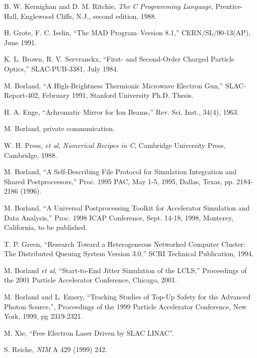 \documentclass[11pt]{article}
\begin{document}
\begin{thebibliography}{99}

    B. W. Kernighan and D. M. Ritchie, {\em The C Programming Language},
    Prentice-Hall, Englewood Cliffs, N.J., second edition, 1988.

    H. Grote, F. C. Iselin, ``The MAD Program--Version 8.1,'' CERN/SL/90-13(AP), June 1991.

    K. L. Brown, R. V. Servranckx, ``First- and Second-Order Charged Particle Optics,'' 
    SLAC-PUB-3381, July 1984.

    M. Borland, ``A High-Brightness Thermionic Microwave Electron Gun,'' SLAC-Report-402,
    February 1991, Stanford University Ph.D. Thesis.

    H. A. Enge, ``Achromatic Mirror for Ion Beams,'' Rev. Sci. Inst., 34(4), 1963.

    M. Borland, private communication.

    W. H. Press, {\em et al}, {\em Numerical Recipes in C}, Cambridge University
    Press, Cambridge, 1988.

M. Borland, ``A Self-Describing File Protocol for Simulation
Integration and Shared Postprocessors,'' Proc. 1995 PAC, May 1-5,
1995, Dallas, Texas, pp. 2184-2186 (1996).

M. Borland, ``A Universal Postprocessing Toolkit for Accelerator 
Simulation and Data Analysis,'' Proc. 1998 ICAP Conference, 
Sept. 14-18, 1998, Monterey, California, to be published.

 T. P. Green, ``Research Toward a Heterogeneous Networked
Computer Cluster: The Distributed Queuing System Version 3.0,'' SCRI
Technical Publication, 1994.

 M. Borland {\em et al}, ``Start-to-End Jitter Simulation
of the LCLS,'' Proceedings of the 2001 Particle Accelerator Conference,
Chicago, 2001.

 M. Borland and L. Emery, ``Tracking Studies of
Top-Up Safety for the Advanced Photon Source,'', Proceedings of the
1999 Particle Accelerator Conference, New York, 1999, pg 2319-2321.

 M. Xie, ``Free Electron Laser Driven by SLAC
LINAC''.

 S. Reiche, {\em NIM} A 429 (1999) 242.


\end{thebibliography}
\end{document}
